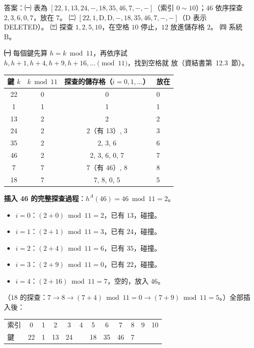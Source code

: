 \begin{pastsoln}
答案：㈠ 表為 $[22, 1, 13, 24, -, 18, 35, 46, 7, -, -]$（索引 $0 \sim 10$）；$46$ 依序探查 $2, 3, 6, 0, 7$，放在
$7$。 ㈡ $[22, 1, \text{D}, \text{D}, -, 18, 35, 46, 7, -, -]$（D 表示 DELETED）。 ㈢ 探查 $1, 2, 5, 10$，在空格
$10$ 停止，$12$ 放進儲存格 $2$。 ㈣ 系統 B。

\textbf{㈠} 每個鍵先算 $h = k \bmod 11$，再依序試 $h, h + 1, h + 4, h + 9, h + 16, \ldots \pmod{11}$，找到空格就
放（資結書第~12.3~節）。
\begin{center}
\small
\begin{tabular}{cccl}
\toprule
鍵 $k$ & $k \bmod 11$ & 探查的儲存格（$i = 0, 1, \ldots$） & 放在 \\
\midrule
22 & 0 & 0 & 0 \\
1 & 1 & 1 & 1 \\
13 & 2 & 2 & 2 \\
24 & 2 & 2（有 13）, 3 & 3 \\
35 & 2 & 2, 3, 6 & 6 \\
46 & 2 & 2, 3, 6, 0, 7 & 7 \\
7 & 7 & 7（有 46）, 8 & 8 \\
18 & 7 & 7, 8, 0, 5 & 5 \\
\bottomrule
\end{tabular}
\end{center}
\textbf{插入 46 的完整探查過程}：$h^A(46) = 46 \bmod 11 = 2$。
\begin{itemize}
\item $i = 0$：$(2 + 0) \bmod 11 = 2$，已有 $13$，碰撞。
\item $i = 1$：$(2 + 1) \bmod 11 = 3$，已有 $24$，碰撞。
\item $i = 2$：$(2 + 4) \bmod 11 = 6$，已有 $35$，碰撞。
\item $i = 3$：$(2 + 9) \bmod 11 = 0$，已有 $22$，碰撞。
\item $i = 4$：$(2 + 16) \bmod 11 = 7$，空的，放入 $46$。
\end{itemize}
（$18$ 的探查：$7 \to 8 \to (7 + 4) \bmod 11 = 0 \to (7 + 9) \bmod 11 = 5$。）全部插入後：
\begin{center}
\small
\begin{tabular}{l*{11}{|c}|}
索引 & 0 & 1 & 2 & 3 & 4 & 5 & 6 & 7 & 8 & 9 & 10 \\ 
鍵 & 22 & 1 & 13 & 24 & & 18 & 35 & 46 & 7 & & \\ 
\end{tabular}
\end{center}


\end{pastsoln}
